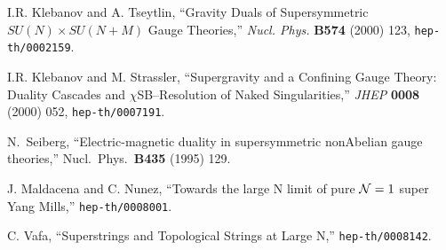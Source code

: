 \documentclass[12pt]{article}
\begin{document}
\begin{thebibliography}{99}
I.R. Klebanov and A. Tseytlin,
``Gravity Duals of Supersymmetric $SU(N)\times SU(N+M)$ Gauge Theories,''
{\em Nucl. Phys.} {\bf B574} (2000) 123,
{\tt hep-th/0002159}.

I.R. Klebanov and M. Strassler,
``Supergravity and a Confining Gauge Theory: Duality Cascades and
$\chi$SB--Resolution of Naked Singularities,''
{\em JHEP} {\bf 0008} (2000) 052, {\tt hep-th/0007191}.

N.~Seiberg,
``Electric-magnetic duality in supersymmetric nonAbelian gauge theories,''
Nucl.\ Phys.\  {\bf B435} (1995) 129.

J. Maldacena and C. Nunez,
``Towards the large N limit of pure ${\cal N}=1$ super Yang Mills,''
{\tt hep-th/0008001}.

C. Vafa,
``Superstrings and Topological Strings at Large N,''
{\tt hep-th/0008142}.

\end{thebibliography}
\end{document}
